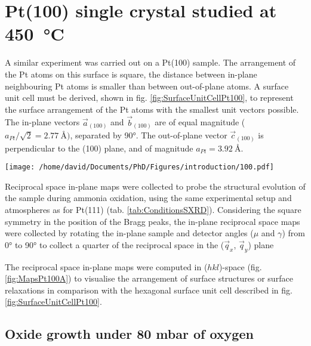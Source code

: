 \section{Pt(100) single crystal studied at \qty{450}{\degreeCelsius}} \label{sec:SXRD100}

A similar experiment was carried out on a Pt(100) sample.
The arrangement of the Pt atoms on this surface is square, the distance between in-plane neighbouring Pt atoms is smaller than between out-of-plane atoms.
A surface unit cell must be derived, shown in fig. \ref{fig:SurfaceUnitCellPt100}, to represent the surface arrangement of the Pt atoms with the smallest unit vectors possible.
The in-plane vectors $\vec{a}_{(100)}$ and $\vec{b}_{(100)}$ are of equal magnitude ($a_{Pt} / \sqrt{2} = \qty{2.77}{\angstrom})$, separated by \ang{90}.
The out-of-plane vector $\vec{c}_{(100)}$ is perpendicular to the (100) plane, and of magnitude $a_{Pt} = \qty{3.92}{\angstrom}$.

\begin{SCfigure}
    \centering
    \texttt{[image: /home/david/Documents/PhD/Figures/introduction/100.pdf]}
    \caption{
        Face-entered cubic unit cell of Pt with $(100)$ crystallographic plane drawn in green.
        $\vec{a}_{(100)}$, $\vec{b}_{(100)}$ and $\vec{c}_{(100)}$ are the $(100)$ surface unit cell vectors.
    }
    \label{fig:SurfaceUnitCellPt100}
\end{SCfigure}

Reciprocal space in-plane maps were collected to probe the structural evolution of the sample during ammonia oxidation, using the same experimental setup and atmospheres as for Pt(111) (tab. \ref{tab:ConditionsSXRD}).
Considering the square symmetry in the position of the Bragg peaks, the in-plane reciprocal space maps were collected by rotating the in-plane sample and detector angles ($\mu$ and $\gamma$) from \ang{0} to \ang{90} to collect a quarter of the reciprocal space in the ($\vec{q}_x$, $\vec{q}_y$) plane

The reciprocal space in-plane maps were computed in ($hkl$)-space (fig. \ref{fig:MapsPt100A}) to visualise the arrangement of surface structures or surface relaxations in comparison with the hexagonal surface unit cell described in fig. \ref{fig:SurfaceUnitCellPt100}.

\subsection{Oxide growth under 80 mbar of oxygen}

